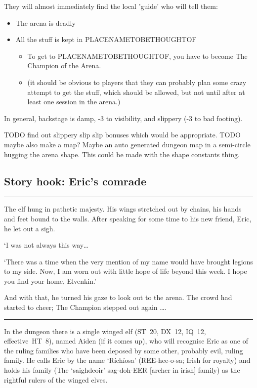 \documentclass[twocolumn]{memoir}
\newenvironment{firstperson}{%
\itshape%
\fancybreak{\rule{0.7\linewidth}{1pt}}%
}{%
\fancybreak{\rule{0.7\linewidth}{1pt}}%
}
\begin{document}
They will almost immediately find the local 'guide' who will tell them:
\begin{itemize}
\item The arena is deadly
\item All the stuff is kept in PLACENAMETOBETHOUGHTOF
\begin{itemize}
\item To get to PLACENAMETOBETHOUGHTOF, you have to become The Champion of the Arena.
\item (it should be obvious to players that they can probably plan some crazy attempt to get the stuff, which should be allowed, but not until after at least one session in the arena.)
\end{itemize}
\end{itemize}

In general, backstage is damp, -3 to visibility, and slippery (-3 to bad footing).

\begin{commentbox}
TODO find out slippery slip slip bonuses which would be appropriate. TODO maybe also make a map? Maybe an auto generated dungeon map in a semi-circle hugging the arena shape. This could be made with the shape constants thing.
\end{commentbox}

\subsection{Story hook: Eric's comrade}
\begin{firstperson}
The elf hung in pathetic majesty. His wings stretched out by chains, his hands and feet bound to the walls. After speaking for some time to his new friend, Eric, he let out a sigh.

`I was not always this way\ldots{}

`There was a time when the very mention of my name would have brought legions to my side. Now, I am worn out with little hope of life beyond this week. I hope you find your home, Elvenkin.'

And with that, he turned his gaze to look out to the arena. The crowd had started to cheer; The Champion stepped out again \ldots{}.
\end{firstperson}

In the dungeon there is a single winged elf (ST~20, DX~12, IQ~12, effective~HT~8), named Aiden (if it comes up), who will recognise Eric as one of the ruling families who have been deposed by some other, probably evil, ruling family. He calls Eric by the name `Ríchíosa' (REE-hee-o-sa; Irish for royalty) and holds his family (The `saighdeoir' sag-doh-EER [archer in irish] family) as the rightful rulers of the winged elves.
\end{document}
